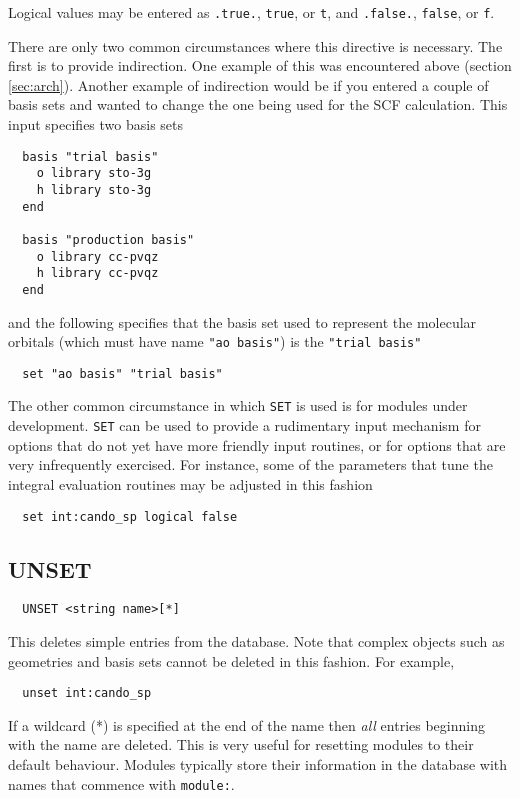 Logical values may be entered as \verb+.true.+, \verb+true+, or
\verb+t+, and \verb+.false.+, \verb+false+, or \verb+f+.

There are only two common circumstances where this directive is
necessary.  The first is to provide indirection.  One example of this
was encountered above (section \ref{sec:arch}).  Another example of
indirection would be if you entered a couple of basis sets and wanted
to change the one being used for the SCF calculation.  This input
specifies two basis sets
\begin{verbatim}
  basis "trial basis"
    o library sto-3g
    h library sto-3g
  end

  basis "production basis"
    o library cc-pvqz
    h library cc-pvqz
  end
\end{verbatim}
and the following specifies that the basis set used to represent the
molecular orbitals (which must have name \verb+"ao basis"+) is the
\verb+"trial basis"+
\begin{verbatim}
  set "ao basis" "trial basis"
\end{verbatim}

The other common circumstance in which \verb+SET+ is used is for
modules under development.  \verb+SET+ can be used to provide a
rudimentary input mechanism for options that do not yet have more
friendly input routines, or for options that are very infrequently
exercised.  For instance, some of the parameters that tune the
integral evaluation routines may be adjusted in this fashion
\begin{verbatim}
  set int:cando_sp logical false
\end{verbatim}

\subsection{UNSET}
\label{sec:unset}

\begin{verbatim}
  UNSET <string name>[*]
\end{verbatim}

This deletes simple entries from the database.  Note that complex
objects such as geometries and basis sets cannot be deleted in this
fashion.  For example, 
\begin{verbatim}
  unset int:cando_sp
\end{verbatim}

If a wildcard (*) is specified at the end of the name then {\em all}
entries beginning with the name are deleted.  This is very useful for
resetting modules to their default behaviour.  Modules typically store
their information in the database with names that commence with
\verb+module:+.

